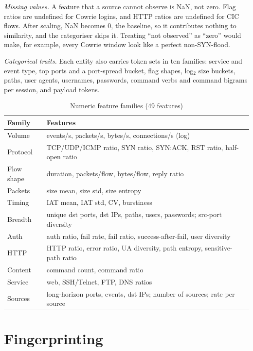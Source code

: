 \documentclass[conference]{IEEEtran}
\begin{document}
\textit{Missing values.} A feature that a source cannot observe is NaN, not zero. Flag ratios are undefined for Cowrie logins, and HTTP ratios are undefined for CIC flows. After scaling, NaN becomes 0, the baseline, so it contributes nothing to similarity, and the categoriser skips it. Treating ``not observed'' as ``zero'' would make, for example, every Cowrie window look like a perfect non-SYN-flood.

\textit{Categorical traits.} Each entity also carries token sets in ten families: service and event type, top ports and a port-spread bucket, flag shapes, log$_2$ size buckets, paths, user agents, usernames, passwords, command verbs and command bigrams per session, and payload tokens.

\begin{table}[t]
\centering
\caption{Numeric feature families (49 features)}
\label{tab:features}
\footnotesize
\begin{tabular}{@{}lp{58mm}@{}}
\toprule
Family & Features \\
\midrule
Volume & events/s, packets/s, bytes/s, connections/s (log) \\
Protocol & TCP/UDP/ICMP ratio, SYN ratio, SYN:ACK, RST ratio, half-open ratio \\
Flow shape & duration, packets/flow, bytes/flow, reply ratio \\
Packets & size mean, size std, size entropy \\
Timing & IAT mean, IAT std, CV, burstiness \\
Breadth & unique dst ports, dst IPs, paths, users, passwords; src-port diversity \\
Auth & auth ratio, fail rate, fail ratio, success-after-fail, user diversity \\
HTTP & HTTP ratio, error ratio, UA diversity, path entropy, sensitive-path ratio \\
Content & command count, command ratio \\
Service & web, SSH/Telnet, FTP, DNS ratios \\
Sources & long-horizon ports, events, dst IPs; number of sources; rate per source \\
\bottomrule
\end{tabular}
\end{table}

\section{Fingerprinting}\label{sec:fingerprint}
\end{document}
